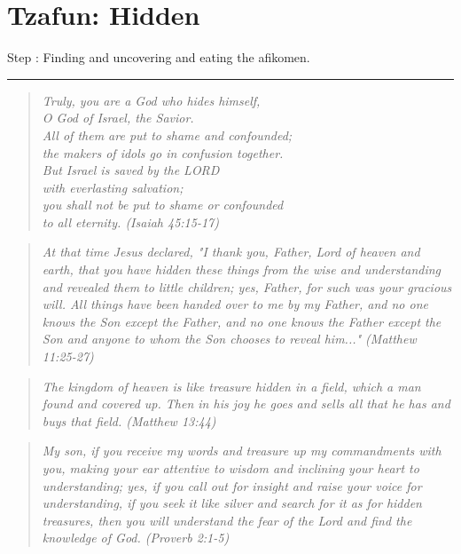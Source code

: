\documentclass[10pt,oneside,footinclude=true,headinclude=true]{scrbook} %
\newcommand\quot[1]{
	\begin{quote}\textit{\small#1}\end{quote}
}
\newcommand{\drawimage}[4]{
	\makebox[0pt][s]{
		\raisebox{#1}[0pt][0pt]{
			\transparent{#2}\texttt{[image: \#4]}
		}
	}
}
\begin{document}
\chapter{Tzafun: Hidden}
\drawimage{-1cm}{0.1}{10cm}{tzafun}
\normalsize
Step \thechapter: Finding and uncovering and eating the afikomen.

\vspace{5mm}
\hrule
\vspace{5mm}

\quot{Truly, you are a God who hides himself,\\
\hspace*{5mm}O God of Israel, the Savior.\\
All of them are put to shame and confounded;\\
\hspace*{5mm}the makers of idols go in confusion together.\\
But Israel is saved by the LORD\\
\hspace*{5mm}with everlasting salvation;\\
you shall not be put to shame or confounded\\
\hspace*{5mm}to all eternity. (Isaiah 45:15-17)}

\quot{At that time Jesus declared, "I thank you, Father, Lord of heaven and earth, that you have hidden these things from the wise and understanding and revealed them to little children; yes, Father, for such was your gracious will. All things have been handed over to me by my Father, and no one knows the Son except the Father, and no one knows the Father except the Son and anyone to whom the Son chooses to reveal him..." (Matthew 11:25-27)}

\quot{The kingdom of heaven is like treasure hidden in a field, which a man found and covered up. Then in his joy he goes and sells all that he has and buys that field. (Matthew 13:44)}

\quot{My son, if you receive my words
    and treasure up my commandments with you,
making your ear attentive to wisdom
    and inclining your heart to understanding;
yes, if you call out for insight
    and raise your voice for understanding,
if you seek it like silver
    and search for it as for hidden treasures,
then you will understand the fear of the Lord
    and find the knowledge of God. (Proverb 2:1-5)}
\end{document}
